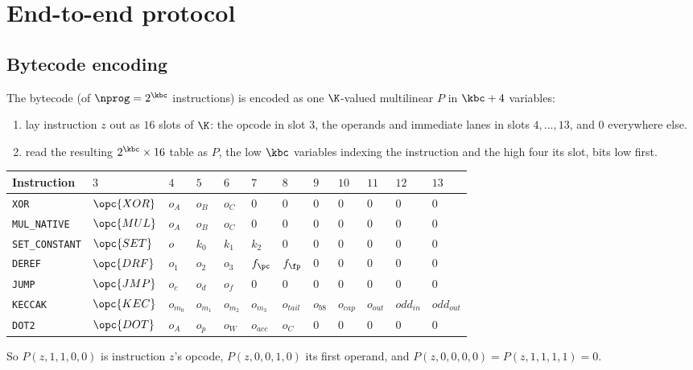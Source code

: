 \section{End-to-end protocol}\label{sec:e2e}

\subsection{Bytecode encoding}\label{sec:e2e-bc}

The bytecode (of $\nprog=2^{\kbc}$ instructions) is encoded as one $\K$-valued multilinear $P$ in $\kbc+4$ variables:
\begin{enumerate}[itemsep=1pt,topsep=3pt]
\item lay instruction $z$ out as $16$ slots of $\K$: the opcode in slot $3$, the operands and immediate lanes in slots $4,\dots,13$, and $0$ everywhere else.
\item read the resulting $2^{\kbc}\times16$ table as $P$, the low $\kbc$ variables indexing the instruction and the high four its slot, bits low first.
\end{enumerate}
\begin{center}
\begin{tabular}{llllllllllll}
\hline
Instruction & $3$ & $4$ & $5$ & $6$ & $7$ & $8$ & $9$ & $10$ & $11$ & $12$ & $13$\\
\hline
\texttt{XOR}           & $\opc{XOR}$ & $o_A$ & $o_B$ & $o_C$ & $0$ & $0$ & $0$ & $0$ & $0$ & $0$ & $0$\\
\texttt{MUL\_NATIVE}   & $\opc{MUL}$ & $o_A$ & $o_B$ & $o_C$ & $0$ & $0$ & $0$ & $0$ & $0$ & $0$ & $0$\\
\texttt{SET\_CONSTANT} & $\opc{SET}$ & $o$   & $k_0$ & $k_1$ & $k_2$ & $0$ & $0$ & $0$ & $0$ & $0$ & $0$\\
\texttt{DEREF}         & $\opc{DRF}$ & $o_1$ & $o_2$ & $o_3$ & $f_{\pc}$ & $f_{\fp}$ & $0$ & $0$ & $0$ & $0$ & $0$\\
\texttt{JUMP}          & $\opc{JMP}$ & $o_c$ & $o_d$ & $o_f$ & $0$ & $0$ & $0$ & $0$ & $0$ & $0$ & $0$\\
\texttt{KECCAK}        & $\opc{KEC}$ & $o_{m_0}$ & $o_{m_1}$ & $o_{m_2}$ & $o_{m_3}$ & $o_{\mathit{tail}}$ & $o_{\mathit{b8}}$ & $o_{\mathit{cap}}$ & $o_{\mathit{out}}$ & $\mathit{odd}_{\mathit{in}}$ & $\mathit{odd}_{\mathit{out}}$\\
\texttt{DOT2}          & $\opc{DOT}$ & $o_A$ & $o_p$ & $o_W$ & $o_{\mathit{acc}}$ & $o_C$ & $0$ & $0$ & $0$ & $0$ & $0$\\
\hline
\end{tabular}
\end{center}
So $P(z,1,1,0,0)$ is instruction $z$'s opcode, $P(z,0,0,1,0)$ its first operand, and $P(z,0,0,0,0)=P(z,1,1,1,1)=0$.

